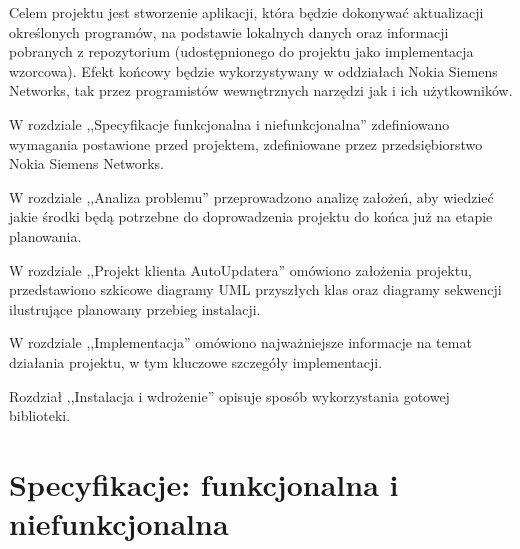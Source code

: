 \documentclass[polish,12pt,titlepage]{article}
\begin{document}
Celem projektu jest stworzenie aplikacji, która będzie dokonywać aktualizacji
określonych programów, na podstawie lokalnych danych oraz informacji pobranych 
z repozytorium (udostępnionego do projektu jako implementacja wzorcowa). 
Efekt końcowy będzie wykorzystywany w oddziałach Nokia Siemens Networks, tak 
przez programistów wewnętrznych narzędzi jak i ich użytkowników.

W rozdziale ,,Specyfikacje funkcjonalna i niefunkcjonalna'' zdefiniowano
wymagania postawione przed projektem, zdefiniowane przez przedsiębiorstwo
Nokia Siemens Networks.

W rozdziale ,,Analiza problemu'' przeprowadzono analizę założeń, aby wiedzieć
jakie środki będą potrzebne do doprowadzenia projektu do końca już na etapie
planowania.

W rozdziale ,,Projekt klienta AutoUpdatera'' omówiono założenia projektu,
przedstawiono szkicowe diagramy UML przyszłych klas oraz diagramy sekwencji
ilustrujące planowany przebieg instalacji.

W rozdziale ,,Implementacja'' omówiono najważniejsze informacje na temat
działania projektu, w tym kluczowe szczegóły implementacji.

Rozdział ,,Instalacja i wdrożenie'' opisuje sposób wykorzystania gotowej
biblioteki.

\newpage


\section{Specyfikacje: funkcjonalna i niefunkcjonalna}
\end{document}
